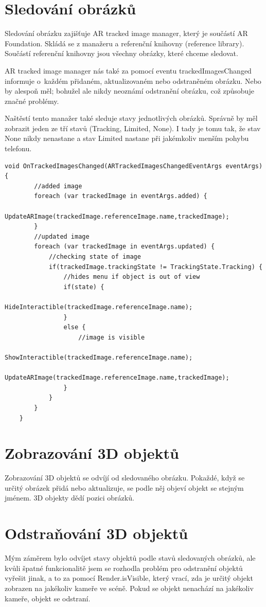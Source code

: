 \documentclass[12pt, a4paper,
twoside,        %
openright
]{report}
\begin{document}
\newpage

\section {Sledování obrázků}
\label{sec:sledovani_obrazku}
 Sledování obrázku zajišťuje AR tracked image manager, který je součástí AR Foundation. Skládá se z manažeru a referenční knihovny (reference library). Součástí referenční knihovny jsou všechny obrázky, které chceme sledovat.
 
AR tracked image manager nás také za pomocí eventu trackedImagesChanged informuje o~každém přidaném, aktualizovaném nebo odstraněném obrázku. Nebo by alespoň měl; bohužel ale nikdy neoznámí odstranění obrázku, což způsobuje značné problémy. 

Naštěstí tento manažer také sleduje stavy jednotlivých obrázků. Správně by měl zobrazit jeden ze tří stavů (Tracking, Limited, None). I tady je tomu tak, že stav None nikdy nenastane a stav Limited nastane při jakémkoliv menším pohybu telefonu. 


\begin{lstlisting}[style=csh, caption={Ukázka kódu sledování obrázků.}]
	void OnTrackedImagesChanged(ARTrackedImagesChangedEventArgs eventArgs) {
		//added image
		foreach (var trackedImage in eventArgs.added) {
			UpdateARImage(trackedImage.referenceImage.name,trackedImage);
		}
		//updated image
		foreach (var trackedImage in eventArgs.updated) {
			//checking state of image
			if(trackedImage.trackingState != TrackingState.Tracking) {
				//hides menu if object is out of view
				if(state) {
					HideInteractible(trackedImage.referenceImage.name);	
				}
				else {
					//image is visible
					ShowInteractible(trackedImage.referenceImage.name);
					UpdateARImage(trackedImage.referenceImage.name,trackedImage);
				}
			}
		}
	}
\end{lstlisting}


\newpage

\section {Zobrazování 3D objektů}
\label{sec:zobrazovani_3d_objektu}
Zobrazování 3D objektů se odvíjí od sledovaného obrázku. Pokaždé, když se určitý obrázek přidá nebo aktualizuje, se podle něj objeví objekt se stejným jménem. 3D objekty dědí pozici obrázků. 

\section{Odstraňování 3D objektů}
\label{sec:odstraneni_3d_objektu}
Mým záměrem bylo odvíjet stavy objektů podle stavů sledovaných obrázků, ale kvůli špatné funkcionalitě jsem se rozhodla problém pro odstranění objektů vyřešit jinak, a to za pomocí Render.isVisible, který vrací, zda je určitý objekt zobrazen na jakékoliv kameře ve scéně. Pokud se objekt nenachází na jakékoliv kameře, objekt se odstraní. 
\end{document}
